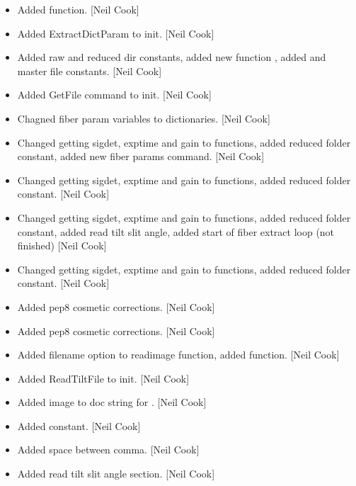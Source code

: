 \documentclass[a4paper,10pt,english]{report}
\begin{document}
\begin{itemize}
\item {} 
Added  function. {[}Neil Cook{]}

\item {} 
Added ExtractDictParam to init. {[}Neil Cook{]}

\item {} 
Added raw and reduced dir constants, added new function ,
added  and master file constants. {[}Neil Cook{]}

\item {} 
Added GetFile command to init. {[}Neil Cook{]}

\item {} 
Chagned fiber param variables to dictionaries. {[}Neil Cook{]}

\item {} 
Changed getting sigdet, exptime and gain to functions, added reduced
folder constant, added new fiber params command. {[}Neil Cook{]}

\item {} 
Changed getting sigdet, exptime and gain to functions, added reduced
folder constant. {[}Neil Cook{]}

\item {} 
Changed getting sigdet, exptime and gain to functions, added reduced
folder constant, added read tilt slit angle, added start of fiber
extract loop (not finished) {[}Neil Cook{]}

\item {} 
Changed getting sigdet, exptime and gain to functions, added reduced
folder constant. {[}Neil Cook{]}

\item {} 
Added pep8 cosmetic corrections. {[}Neil Cook{]}

\item {} 
Added pep8 cosmetic corrections. {[}Neil Cook{]}

\item {} 
Added filename option to readimage function, added 
function. {[}Neil Cook{]}

\item {} 
Added ReadTiltFile to init. {[}Neil Cook{]}

\item {} 
Added image to doc string for . {[}Neil Cook{]}

\item {} 
Added  constant. {[}Neil Cook{]}

\item {} 
Added space between comma. {[}Neil Cook{]}

\item {} 
Added read tilt slit angle section. {[}Neil Cook{]}

\end{itemize}
\end{document}
